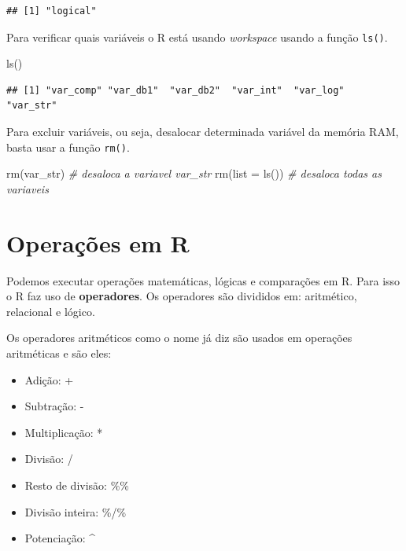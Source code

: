 \documentclass[
]{book}
\newenvironment{Shaded}{\begin{snugshade}}{\end{snugshade}}
\newcommand{\AttributeTok}[1]{\textcolor[rgb]{0.77,0.63,0.00}{#1}}
\newcommand{\CommentTok}[1]{\textcolor[rgb]{0.56,0.35,0.01}{\textit{#1}}}
\newcommand{\FunctionTok}[1]{\textcolor[rgb]{0.00,0.00,0.00}{#1}}
\newcommand{\NormalTok}[1]{#1}
\providecommand{\tightlist}{%
  \setlength{\itemsep}{0pt}\setlength{\parskip}{0pt}}
\theoremstyle{definition}
\theoremstyle{definition}
\theoremstyle{definition}
\theoremstyle{definition}
\theoremstyle{remark}
\begin{document}
\begin{verbatim}
## [1] "logical"
\end{verbatim}

Para verificar quais variáveis o R está usando \emph{workspace} usando a função \texttt{ls()}.

\begin{Shaded}
\begin{Highlighting}[]
\FunctionTok{ls}\NormalTok{()}
\end{Highlighting}
\end{Shaded}

\begin{verbatim}
## [1] "var_comp" "var_db1"  "var_db2"  "var_int"  "var_log"  "var_str"
\end{verbatim}

Para excluir variáveis, ou seja, desalocar determinada variável da memória RAM, basta usar a função \texttt{rm()}.

\begin{Shaded}
\begin{Highlighting}[]
\FunctionTok{rm}\NormalTok{(var\_str)     }\CommentTok{\# desaloca a variavel var\_str}
\FunctionTok{rm}\NormalTok{(}\AttributeTok{list =} \FunctionTok{ls}\NormalTok{()) }\CommentTok{\# desaloca todas as variaveis}
\end{Highlighting}
\end{Shaded}

\hypertarget{operauxe7uxf5es-em-r}{%
\section{Operações em R}\label{operauxe7uxf5es-em-r}}

Podemos executar operações matemáticas, lógicas e comparações em R. Para isso o R faz uso de \textbf{operadores}. Os operadores são divididos em: aritmético, relacional e lógico.

Os operadores aritméticos como o nome já diz são usados em operações aritméticas e são eles:

\begin{itemize}
\tightlist
\item
  Adição: +
\item
  Subtração: -
\item
  Multiplicação: *
\item
  Divisão: /
\item
  Resto de divisão: \%\%
\item
  Divisão inteira: \%/\%
\item
  Potenciação: \^{}
\end{itemize}
\end{document}
